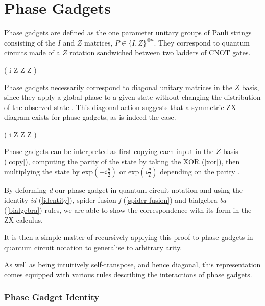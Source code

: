 \section{Phase Gadgets}
Phase gadgets are defined as the one parameter unitary groups of Pauli strings consisting of the $I$ and $Z$ matrices, $P \in \{I, Z\}^{\otimes n}$. They correspond to quantum circuits made of a $Z$ rotation sandwiched between two ladders of CNOT gates.

{ \left( i  Z \otimes Z \otimes Z \right)}

Phase gadgets necessarily correspond to diagonal unitary matrices in the $Z$ basis, since they apply a global phase to a given state without changing the distribution of the observed state \cite{Yeung2020}. This diagonal action suggests that a symmetric ZX diagram exists for phase gadgets, as is indeed the case.

{ \left( i  Z \otimes Z \otimes Z \right)}

Phase gadgets can be interpreted as first copying each input in the $Z$ basis (\ref{copy}), computing the parity of the state by taking the XOR (\ref{xor}), then multiplying the state by $\text{exp} \left(-i\frac{\theta}{2} \right)$ or $\text{exp} \left(i\frac{\theta}{2} \right)$ depending on the parity \cite{Yeung2020}.

By deforming \textit{d} our phase gadget in quantum circuit notation and using the identity \textit{id} (\ref{identity}), spider fusion \textit{f} (\ref{spider-fusion}) and bialgebra \textit{ba} (\ref{bialgebra}) rules, we are able to show the correspondence with its form in the ZX calculus.


It is then a simple matter of recursively applying this proof to phase gadgets in quantum circuit notation to generalise to arbitrary arity.

%
\label{phase-gadget-proof}

As well as being intuitively self-transpose, and hence diagonal, this representation comes equipped with various rules describing the interactions of phase gadgets. 


\subsubsection{Phase Gadget Identity}%
\label{phase-gadget-identity}


